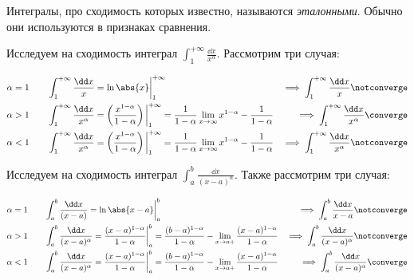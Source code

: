 
\begin{definition}
  Интегралы, про сходимость которых известно, называются \textit{эталонными}.
  Обычно они используются в признаках сравнения.
\end{definition}

Исследуем на сходимость интеграл
\(\displaystyle \int_{1}^{+\infty} \frac{\dd x}{x^{\alpha}}\).
Рассмотрим три случая:

\begin{align*}
  \alpha = 1 &
  \qquad
  \int_{1}^{+\infty} \frac{\dd x}{x}
  = \ln \abs{x} \bigg\vert_{1}^{+\infty}
  & \implies \int_{1}^{+\infty} \frac{\dd x}{x} \notconverge
  \\
  \alpha > 1 &
  \qquad
  \int_{1}^{+\infty} \frac{\dd x}{x^{\alpha}}
  = \left(\frac{x^{1 - \alpha}}{1 - \alpha}\right) \bigg\vert_{1}^{+\infty}
  = \frac{1}{1 - \alpha} \lim_{x \to \infty} x^{1 - \alpha}
    - \frac{1}{1 - \alpha}
    & \implies \int_{1}^{+\infty} \frac{\dd x}{x^{\alpha}} \converge
  \\
  \alpha < 1 &
  \qquad
  \int_{1}^{+\infty} \frac{\dd x}{x^{\alpha}}
  = \left(\frac{x^{1 - \alpha}}{1 - \alpha}\right) \bigg\vert_{1}^{+\infty}
  = \frac{1}{1 - \alpha} \lim_{x \to \infty} x^{1 - \alpha}
    - \frac{1}{1 - \alpha}
  & \implies \int_{1}^{+\infty} \frac{\dd x}{x^{\alpha}} \notconverge
\end{align*}

Исследуем на сходимость интеграл
\(\displaystyle \int_{a}^{b} \frac{\dd x}{(x - a)^{\alpha}}\).
Также рассмотрим три случая:

\begin{align*}
  \alpha = 1 &
  \qquad
  \int_{a}^{b} \frac{\dd x}{(x - a)}
  = \ln \abs{x - a} \bigg\vert_{a}^{b}
  & \implies \int_{a}^{b} \frac{\dd x}{x - a} \notconverge
  \\
  \alpha > 1 &
  \qquad
  \int_{a}^{b} \frac{\dd x}{(x - a)^{\alpha}}
  = \frac{(x - a)^{1 - \alpha}}{1 - \alpha} \bigg\vert_{a}^{b}
  = \frac{(b - a)^{1 - \alpha}}{1 - \alpha} -
    \lim_{x \to a+} \frac{(x - a)^{1 - \alpha}}{1 - \alpha}
  & \implies \int_{a}^{b} \frac{\dd x}{(x - a)^{\alpha}} \notconverge
  \\
  \alpha < 1 &
  \qquad
  \int_{a}^{b} \frac{\dd x}{(x - a)^{\alpha}}
  = \frac{(x - a)^{1 - \alpha}}{1 - \alpha} \bigg\vert_{a}^{b}
  = \frac{(b - a)^{1 - \alpha}}{1 - \alpha} -
    \lim_{x \to a+} \frac{(x - a)^{1 - \alpha}}{1 - \alpha}
  & \implies \int_{a}^{b} \frac{\dd x}{(x - a)^{\alpha}} \converge
\end{align*}

